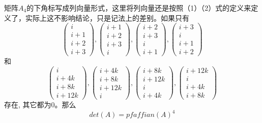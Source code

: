 \documentclass[twoside,a4paper,CCT]{cctart}   %
\begin{document}
\begin{theorem}
矩阵$A_{4}$的下角标写成列向量形式，这里将列向量还是按照（1）（2）式的定义来定义了，实际上这不影响结论，只是记法上的差别。如果只有$$\begin{pmatrix}i\\i+1\\i+2\\i+3 \end{pmatrix},\begin{pmatrix}i+1\\i+2\\i+3\\i \end{pmatrix},\begin{pmatrix}i+2\\i+3\\i\\i+1 \end{pmatrix},\begin{pmatrix}i+3\\i\\i+1\\i+2 \end{pmatrix}$$和$$\begin{pmatrix}i\\i+4k\\i+8k\\i+12k \end{pmatrix},\begin{pmatrix}i+4k\\i+8k\\i+12k\\i \end{pmatrix},\begin{pmatrix}i+8k\\i+12k\\i\\i+4k \end{pmatrix},\begin{pmatrix}i+12k\\i\\i+4k\\i+8k \end{pmatrix}$$ 存在, 其它都为0。那么$$det(A)=pfaffian(A)^{4}$$
\end{theorem}
\end{document}
